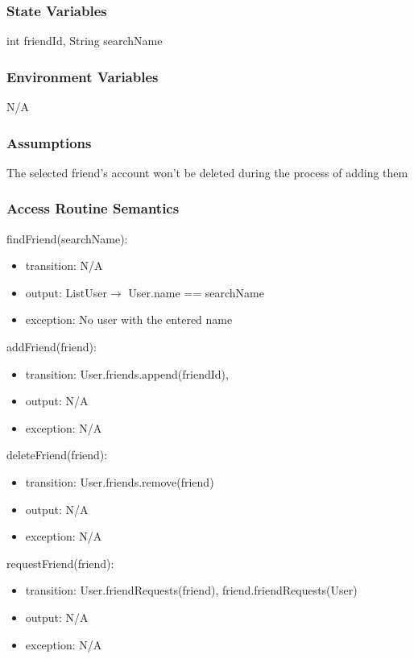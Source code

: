 \documentclass[12pt, titlepage]{article}
\begin{document}
\subsubsection{State Variables}
int friendId, String searchName

\subsubsection{Environment Variables}
N/A

\subsubsection{Assumptions}
The selected friend's account won't be deleted during the process of adding them

\subsubsection{Access Routine Semantics}

\noindent findFriend(searchName):
\begin{itemize}
\item transition: N/A
\item output: List\textlangle User\textrangle $\rightarrow$ User.name == searchName
\item exception: No user with the entered name
\end{itemize}

\noindent addFriend(friend):
\begin{itemize}
\item transition: User.friends.append(friendId), 
\item output: N/A
\item exception: N/A
\end{itemize}

\noindent deleteFriend(friend):
\begin{itemize}
\item transition: User.friends.remove(friend)
\item output: N/A
\item exception: N/A
\end{itemize}

\noindent requestFriend(friend):
\begin{itemize}
	\item transition: User.friendRequests(friend), friend.friendRequests(User)
	\item output: N/A
	\item exception: N/A
\end{itemize}
\end{document}

